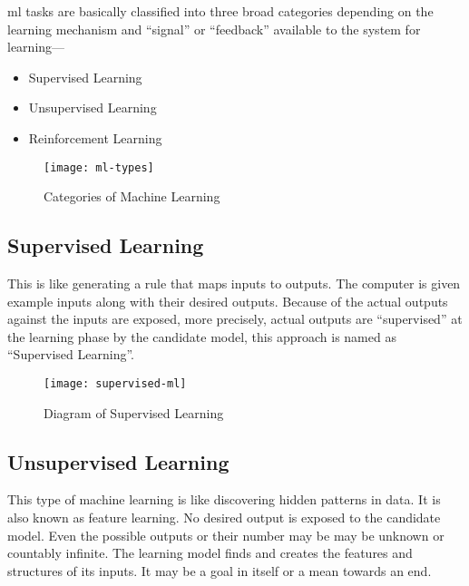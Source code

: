         \acrshort{ml} tasks are basically classified into three broad categories depending on the learning mechanism and ``signal'' or ``feedback'' available to the system for learning---
        \begin{itemize}
         \item Supervised Learning
         \item Unsupervised Learning
         \item Reinforcement Learning
        \end{itemize}
        
        \begin{figure}[h]
            \centering
            \texttt{[image: ml-types]}
            \caption{Categories of Machine Learning}
            \label{fig:ml_types}
        \end{figure} 
        
        \subsection{Supervised Learning}
            This is like generating a rule that maps inputs to outputs. The computer is given example inputs along with their desired outputs\cite{kotsiantis2007supervised}. Because of the actual outputs against the inputs are exposed, more precisely, actual outputs are ``supervised'' at the learning phase by the candidate model, this approach is named as ``Supervised Learning''\cite{kotsiantis2007supervised}.
        
            \begin{figure}[h]
                \centering
                \texttt{[image: supervised-ml]}
                \caption{Diagram of Supervised Learning}
                \label{fig:supervised_ml}
            \end{figure} 
            
            
        \subsection{Unsupervised Learning}
            This type of machine learning is like discovering hidden patterns in data. It is also known as feature learning. No desired output is exposed to the candidate model. Even the possible outputs or their number may be may be unknown or countably infinite\cite{ma2008unsupervised}. The learning model finds and creates the features and structures of its inputs. It may be a goal in itself or a mean towards an end\cite{ma2008unsupervised}.
            
